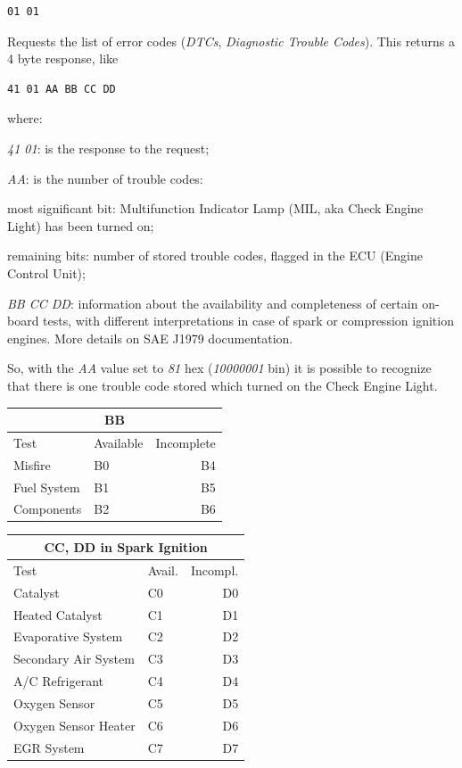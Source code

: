 \documentclass[twoside]{article}
\begin{document}
\begin{multicols}{2}
\begin{lstlisting}[language=bash]
01 01
\end{lstlisting}
Requests the list of error codes (\emph{DTCs}, \emph{Diagnostic Trouble Codes}).
This returns a 4 byte response, like
\begin{lstlisting}[language=bash]
41 01 AA BB CC DD
\end{lstlisting}
where:
\begin{compactitem}
  \item \emph{41 01}: is the response to the request;
  \item \emph{AA}: is the number of trouble codes:
  \begin{compactitem}
    \item most significant bit: Multifunction Indicator Lamp (MIL, aka Check Engine Light) has been turned on;
    \item remaining bits: number of stored trouble codes, flagged in the ECU (Engine Control Unit);
  \end{compactitem}
  \item \emph{BB CC DD}: information about the availability and completeness of certain on-board tests, with different interpretations in case of spark or compression ignition engines. More details on SAE J1979 documentation.
\end{compactitem}

So, with the \emph{AA} value set to \emph{81} hex (\emph{10000001} bin) it is possible to recognize that there is one trouble code stored which turned on the Check Engine Light.

\begin{table}[H]
\centering
\begin{tabular}{llr}
\multicolumn{3}{c}{BB} \\
\toprule
Test & Available & Incomplete \\
\midrule
Misfire & B0 & B4 \\          
Fuel System & B1 & B5 \\
Components & B2 & B6 \\
\bottomrule
\end{tabular}
\end{table}

\begin{table}[H]
\centering
\begin{tabular}{llr}
\multicolumn{3}{c}{CC, DD in Spark Ignition} \\
\toprule
Test & Avail. & Incompl. \\
\midrule
Catalyst & C0 & D0 \\
Heated Catalyst & C1 & D1 \\
Evaporative System & C2 & D2 \\
Secondary Air System & C3 & D3 \\
A/C Refrigerant & C4 & D4 \\
Oxygen Sensor & C5 & D5 \\
Oxygen Sensor Heater & C6 & D6 \\
EGR System & C7 & D7 \\
\bottomrule
\end{tabular}
\end{table}


\end{multicols}
\end{document}

